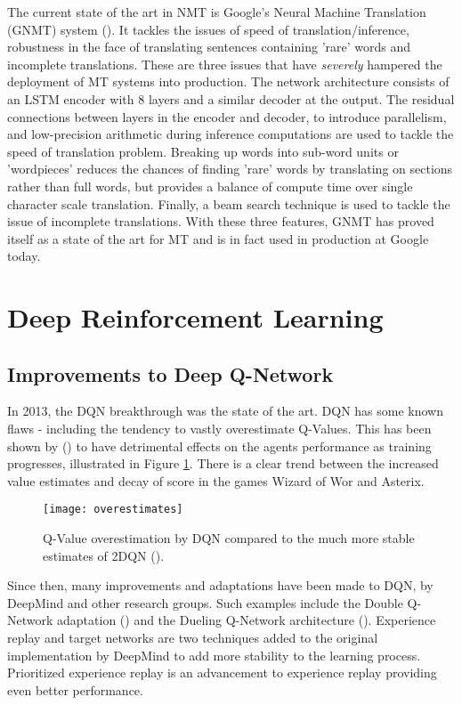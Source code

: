The current state of the art in NMT is Google's Neural Machine Translation (GNMT) system (\citet{wu2016google}). It tackles the issues of speed of translation/inference, robustness in the face of translating sentences containing 'rare' words and incomplete translations. These are three issues that have \textit{severely} hampered the deployment of MT systems into production. The network architecture consists of an LSTM encoder with 8 layers and a similar decoder at the output. The residual connections between layers in the encoder and decoder, to introduce parallelism, and low-precision arithmetic during inference computations are used to tackle the speed of translation problem. Breaking up words into sub-word units or 'wordpieces' reduces the chances of finding 'rare' words by translating on sections rather than full words, but provides a balance of compute time over single character scale translation. Finally, a beam search technique is used to tackle the issue of incomplete translations. With these three features, GNMT has proved itself as a state of the art for MT and is in fact used in production at Google today.

\section{Deep Reinforcement Learning}
\subsection{Improvements to Deep Q-Network}
In 2013, the DQN breakthrough was the state of the art. DQN has some known flaws - including the tendency to vastly overestimate Q-Values. This has been shown by (\citet{doubleq}) to have detrimental effects on the agents performance as training progresses, illustrated in Figure \ref{fig:overestimates}. There is a clear trend between the increased value estimates and decay of score in the games Wizard of Wor and Asterix.

\begin{figure}[h]
    \centering
    \texttt{[image: overestimates]}
    \caption{Q-Value overestimation by DQN compared to the much more stable estimates of 2DQN (\citet{doubleq}).}
    \label{fig:overestimates}
\end{figure}

Since then, many improvements and adaptations have been made to DQN, by DeepMind and other research groups. Such examples include the Double Q-Network adaptation (\citet{doubleq}) and the Dueling Q-Network architecture (\citet{dueling}). Experience replay and target networks are two techniques added to the original implementation by DeepMind to add more stability to the learning process. Prioritized experience replay is an advancement to experience replay providing even better performance.

